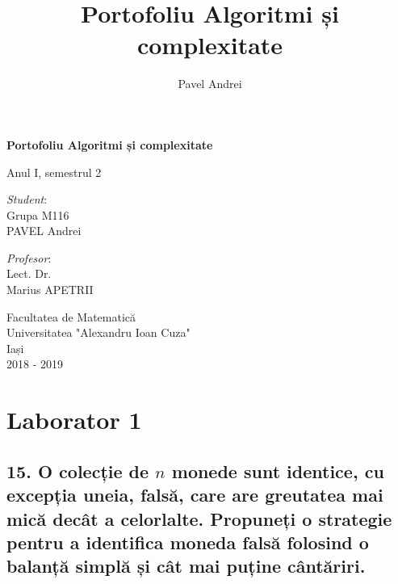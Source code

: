 \documentclass[11pt]{article}
\author{Pavel Andrei}
\date{}
\title{Portofoliu Algoritmi și complexitate}
\begin{document}
\begin{titlepage}
    \begin{center}
        \vspace*{7cm}
 
 
        \Huge
        \textbf{Portofoliu Algoritmi și complexitate}

        \vspace{0.5cm}
        \LARGE
        Anul I, semestrul 2

        \vspace{3cm}
    \end{center}
%
\begin{minipage}[t]{0.7\textwidth}
    \raggedright
    \onehalfspacing
    \large
    \textit{Student}:\\[.5\baselineskip]
    Grupa M116\\
    PAVEL Andrei
\end{minipage}
\begin{minipage}[t]{0.3\textwidth}
    \onehalfspacing
    \large
    \textit{Profesor}:\\[.5\baselineskip]
    Lect. Dr. \\
    Marius APETRII

\end{minipage}%

    \begin{center}
        \vfill
 
        \vspace{0.8cm}
 
 
        \Large
        Facultatea de Matematică\\
        Universitatea "Alexandru Ioan Cuza"\\
        Iași\\
        2018 - 2019
 
    \end{center}
\end{titlepage}

\section*{Laborator 1}
\label{sec:org23880cf}
\subsection*{15. O colecție de \(n\) monede sunt identice, cu excepția uneia, falsă, care are greutatea mai mică decât a celorlalte. Propuneți o strategie pentru a identifica moneda falsă folosind o balanță simplă și cât mai puține cântăriri.}
\label{sec:org638f636}
\end{document}
